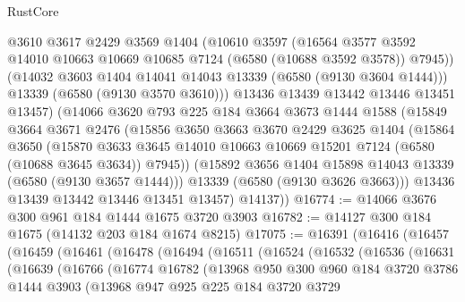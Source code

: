 \begin{lexlean}{RustCore}
\begin{coremodule}
          @3610
          @3617
          @2429
          @3569
          @1404
          (@10610
            @3597
            (@16564
              @3577
              @3592
              @14010
              @10663
              @10669
              @10685
              @7124
              (@6580 (@10688 @3592 @3578))
              @7945))
          (@14032 @3603 @1404 @14041 @14043 @13339 (@6580 (@9130 @3604 @1444)))
          @13339
          (@6580 (@9130 @3570 @3610)))
        @13436
        @13439
        @13442
        @13446
        @13451
        @13457)
      (@14066
        @3620
        @793
        @225
        @184
        @3664
        @3673
        @1444
        @1588
        (@15849
          @3664
          @3671
          @2476
          (@15856
            @3650
            @3663
            @3670
            @2429
            @3625
            @1404
            (@15864
              @3650
              (@15870
                @3633
                @3645
                @14010
                @10663
                @10669
                @15201
                @7124
                (@6580 (@10688 @3645 @3634))
                @7945))
            (@15892 @3656 @1404 @15898 @14043 @13339 (@6580 (@9130 @3657 @1444)))
            @13339
            (@6580 (@9130 @3626 @3663)))
          @13436
          @13439
          @13442
          @13446
          @13451
          @13457)
        @14137))
@16774 := @14066 @3676 @300 @961 @184 @1444 @1675 @3720 @3903
@16782 := @14127 @300 @184 @1675 (@14132 @203 @184 @1674 @8215)
@17075 := @16391
    (@16416
      (@16457
        (@16459
          (@16461
            (@16478
              (@16494
                (@16511
                  (@16524
                    (@16532
                      (@16536
                        (@16631
                          (@16639
                            (@16766
                              (@16774
                                @16782
                                (@13968
                                  @950
                                  @300
                                  @960
                                  @184
                                  @3720
                                  @3786
                                  @1444
                                  @3903
                                  (@13968
                                    @947
                                    @925
                                    @225
                                    @184
                                    @3720
                                    @3729

\end{coremodule}
\end{lexlean}
